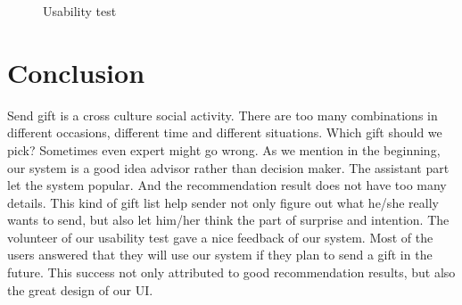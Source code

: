 \documentclass[11pt,twocolumn]{article}
\begin{document}
\begin{figure}[h!t]
\caption{Usability test}
\label{use}
\end{figure}


\section{Conclusion}

Send gift is a cross culture social activity.  There are too many combinations in different occasions, different time and different situations.   Which gift should we pick?   Sometimes even expert might go wrong.   
As we mention in the beginning, our system is a good idea advisor rather than decision maker.   The assistant part let the system popular.   And the recommendation result does not have too many details. This kind of gift list help sender not only figure out what he/she really wants to send, but also let him/her think the part of surprise and intention.
The volunteer of our usability test gave a nice feedback of our system.   Most of the users answered that they will use our system if they plan to send a gift in the future.   This success not only attributed to good recommendation results, but also the great design of our UI.
\end{document}
